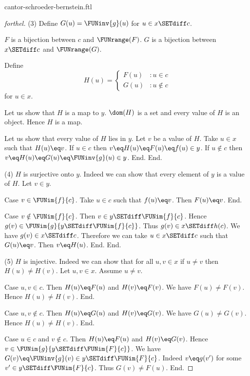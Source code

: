 \documentclass{naproche-library}
\begin{document}
\begin{smodule}[title=The Cantor-Schröder-Bernstein Theorem]{cantor-schroeder-bernstein.ftl}
\begin{proof}[forthel]
    (3) Define $G(u) = \FUNinv{g}(u)$ for $u \in x \SETdiff c$.

    $F$ is a bijection between $c$ and $\FUNrange(F)$.
    $G$ is a bijection between $x \SETdiff c$ and $\FUNrange(G)$.

    Define \[ H(u) =
      \begin{cases}
        F(u) & : u \in c \\
        G(u) & : u \notin c
      \end{cases} \]
    for $u \in x$.

    Let us show that $H$ is a map to $y$.
      $\dom(H)$ is a set and every value of $H$ is an object.
      Hence $H$ is a map.

      Let us show that every value of $H$ lies in $y$.
        Let $v$ be a value of $H$.
        Take $u \in x$ such that $H(u) \eq v$.
        If $u \in c$ then $v \eq H(u) \eq F(u) \eq f(u) \in y$.
        If $u \notin c$ then $v \eq H(u) \eq G(u) \eq \FUNinv{g}(u) \in y$.
      End.
    End.

    (4) $H$ is surjective onto $y$.
    Indeed we can show that every element of $y$ is a value of $H$.
      Let $v \in y$.

      Case $v \in \FUNim{f}{c}$.
        Take $u \in c$ such that $f(u) \eq v$.
        Then $F(u) \eq v$.
      End.

      Case $v \notin \FUNim{f}{c}$.
        Then $v \in y \SETdiff \FUNim{f}{c}$.
        Hence $g(v) \in \FUNim{g}{y \SETdiff \FUNim{f}{c}}$.
        Thus $g(v) \in x \SETdiff h(c)$.
        We have $g(v) \in x \SETdiff c$.
        Therefore we can take $u \in x \SETdiff c$ such that $G(u) \eq v$.
        Then $v \eq H(u)$.
      End.
    End.

    (5) $H$ is injective.
    Indeed we can show that for all $u, v \in x$ if $u \neq v$ then $H(u) \neq H(v)$.
      Let $u,v \in x$.
      Assume $u \neq v$.

      Case $u,v \in c$.
        Then $H(u) \eq F(u)$ and $H(v) \eq F(v)$.
        We have $F(u) \neq F(v)$.
        Hence $H(u) \neq H(v)$.
      End.

      Case $u,v \notin c$.
        Then $H(u) \eq G(u)$ and $H(v) \eq G(v)$.
        We have $G(u) \neq G(v)$.
        Hence $H(u) \neq H(v)$.
      End.

      Case $u \in c$ and $v \notin c$.
        Then $H(u) \eq F(u)$ and $H(v) \eq G(v)$.
        Hence $v \in \FUNim{g}{y \SETdiff \FUNim{F}{c}}$.
        We have $G(v) \eq \FUNinv{g}(v) \in y \SETdiff \FUNim{F}{c}$.
        Indeed $v \eq g(v')$ for some $v' \in y \SETdiff \FUNim{F}{c}$.
        Thus $G(v) \neq F(u)$.
      End.


\end{proof}
\end{smodule}
\end{document}
